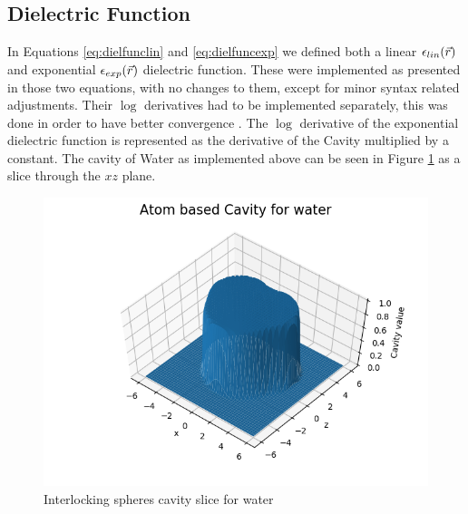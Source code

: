 \documentclass[../master_thesis.tex]{subfiles}
\begin{document}
\subsection{Dielectric Function}
In Equations \ref{eq:dielfunclin} and \ref{eq:dielfuncexp} we defined both a
linear $\epsilon_{lin}(\vec{r})$ and exponential $\epsilon_{exp}(\vec{r})$ dielectric function. These were implemented as presented
in those two equations, with no changes to them, except for minor syntax related
adjustments. Their $\log$ derivatives had to be implemented separately,
this was done in order to have better convergence \cite{FossoTande:2013ka}. The
$\log$ derivative of the exponential dielectric function is represented as the
derivative of the Cavity multiplied by a constant. The cavity of Water as implemented
above can be seen in Figure \ref{fig:watcav} as a slice through the $xz$ plane.

\begin{figure}[ht]
  \includegraphics[width=\linewidth]{img/Figure_1-1.png}
  \caption{Interlocking spheres cavity slice for water}
  \label{fig:watcav}
\end{figure}
\end{document}

